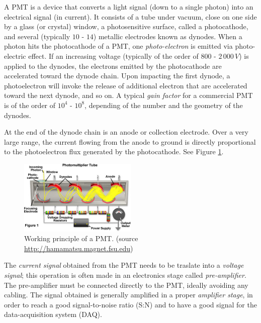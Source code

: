 \documentclass[a4,11pt, notitlepage]{article}
\begin{document}
A PMT is a device that converts a light signal (down to a single photon) into an electrical signal (in current). 
It consists of a tube under vacuum, close on one side by a glass (or crystal) window, a photosensitive surface, called a photocathode, and several (typically $10$ - $14$) metallic electrodes known as dynodes.
When a photon hits the photocathode of a PMT,  %
one \emph{photo-electron} is emitted via photo-electric effect. 
If an increasing voltage (typically of the order of $800$ - $2\,000\,V$) is applied to the dynodes, the electrons emitted by the photocathode are accelerated toward the dynode chain. 
Upon impacting the first dynode, a photoelectron will invoke the release of additional electron that are accelerated toward the next dynode, and so on. %
A typical \emph{gain factor} for a commercial PMT is of the order of $10^4$ - $10^8$, depending of the number and the geometry of the dynodes. 

At the end of the dynode chain is an anode or collection electrode. Over a very large range, the current flowing from the anode to ground is directly proportional to the photoelectron flux generated by the photocathode. See Figure \ref{fig:PMT}. 
\begin{figure}[htbp]
  \begin{center}
    \includegraphics[width=0.5\textwidth]{figures/photomultiplier.jpg}
    \caption{Working principle of a PMT. (source \url{http://hamamatsu.magnet.fsu.edu})}
\label{fig:PMT}
  \end{center}
\end{figure}

The \emph{current signal} obtained from the PMT needs to be traslate into a \emph{voltage signal}; this operation is often made in an electronics stage called \emph{pre-amplifier}. The pre-amplifier must be connected directly to the PMT, ideally avoiding any cabling. 
The signal obtained is generally amplified in a proper \emph{amplifier stage}, in order to reach a good signal-to-noise ratio (S:N) and to have a good signal for the data-acquisition system (DAQ).
\end{document}
